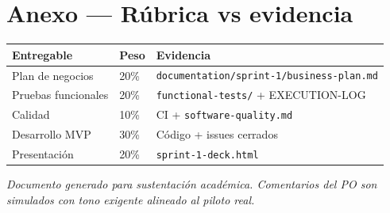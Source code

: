 \documentclass[11pt,a4paper]{article}
\begin{document}
\section*{Anexo — Rúbrica vs evidencia}
\begin{tabular}{@{}p{4.2cm}p{2cm}p{7cm}@{}}
\toprule
\textbf{Entregable} & \textbf{Peso} & \textbf{Evidencia} \\
\midrule
Plan de negocios & 20\% & \texttt{documentation/sprint-1/business-plan.md} \\
Pruebas funcionales & 20\% & \texttt{functional-tests/} + EXECUTION-LOG \\
Calidad & 10\% & CI + \texttt{software-quality.md} \\
Desarrollo MVP & 30\% & Código + issues cerrados \\
Presentación & 20\% & \texttt{sprint-1-deck.html} \\
\bottomrule
\end{tabular}

\vspace{1.2em}
\noindent\textit{Documento generado para sustentación académica. Comentarios del PO son simulados con tono exigente alineado al piloto real.}
\end{document}
